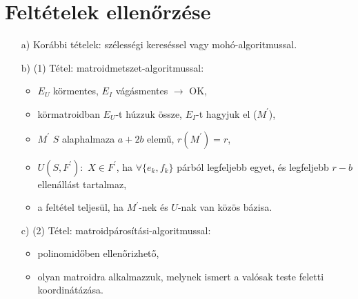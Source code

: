\section*{Feltételek ellenőrzése}
\begin{itemize}
\item[a)] Korábbi tételek: szélességi kereséssel vagy mohó-algoritmussal.
\item[b)] (1) Tétel: matroidmetszet-algoritmussal:
\begin{itemize}
\item $E_{U}$ körmentes, $E_{I}$ vágásmentes $\rightarrow$ OK,
\item körmatroidban $E_{U}$-t húzzuk össze, $E_{I}$-t hagyjuk el ($M^{'}$),
\item $M^{'}$ $S$ alaphalmaza $a+2b$ elemű, $r(M^{'})=r$,
\item $U(S,F^{'}):$ $X\in F^{'}$, ha $\forall\lbrace e_{k},f_{k}\rbrace$ párból legfeljebb egyet, és legfeljebb $r-b$ ellenállást tartalmaz,
\item a feltétel teljesül, ha $M^{'}$-nek és $U$-nak van közös bázisa.
\end{itemize}
\item[c)] (2) Tétel: matroidpárosítási-algoritmussal:
\begin{itemize}
\item polinomidőben ellenőrizhető,
\item olyan matroidra alkalmazzuk, melynek ismert a valósak teste feletti koordinátázása.
\end{itemize}
\end{itemize}


